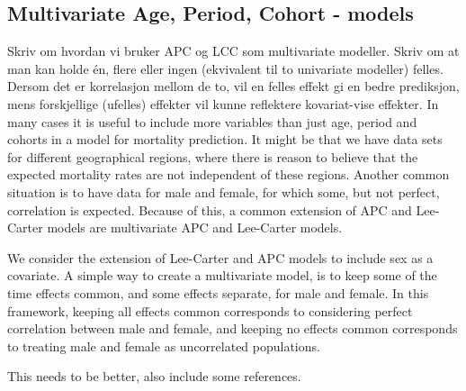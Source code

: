 \subsection{Multivariate Age, Period, Cohort - models}
\label{sec:multivariateAPC}
\textcolor{myDarkGreen}{
Skriv om hvordan vi bruker APC og LCC som multivariate modeller. Skriv om at man kan holde én, flere eller ingen (ekvivalent til to univariate modeller) felles. Dersom det er korrelasjon mellom de to, vil en felles effekt gi en bedre prediksjon, mens forskjellige (ufelles) effekter vil kunne reflektere kovariat-vise effekter. 
}
In many cases it is useful to include more variables than just age, period and cohorts in a model for mortality prediction. It might be that we have data sets for different geographical regions, where there is reason to believe that the expected mortality rates are not independent of these regions. Another common situation is to have data for male and female, for which some, but not perfect, correlation is expected. Because of this, a common extension of APC and Lee-Carter models are multivariate APC and Lee-Carter models. 

We consider the extension of Lee-Carter and APC models to include sex as a covariate. A simple way to create a multivariate model, is to keep some of the time effects common, and some effects separate, for male and female. In this framework, keeping all effects common corresponds to considering perfect correlation between male and female, and keeping no effects common corresponds to treating male and female as uncorrelated populations. 

\textcolor{myDarkGreen}{This needs to be better, also include some references. }